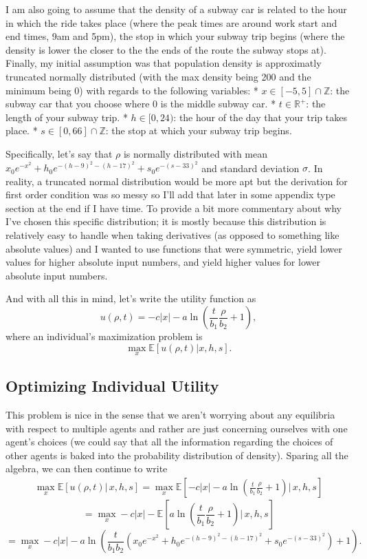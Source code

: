 \documentclass[11pt]{article}
\begin{document}
I am also going to assume that the density of a subway car is related to
the hour in which the ride takes place (where the peak times are around
work start and end times, 9am and 5pm), the stop in which your subway
trip begins (where the density is lower the closer to the the ends of
the route the subway stops at). Finally, my initial assumption was that
population density is approximatly truncated normally distributed (with
the max density being 200 and the minimum being 0) with regards to the
following variables: * \(x \in [-5,5]\cap \mathbb{Z}\): the subway car
that you choose where 0 is the middle subway car. *
\(t \in \mathbb{R}^+\): the length of your subway trip. *
\(h \in [0,24)\): the hour of the day that your trip takes place. *
\(s \in [0,66]\cap \mathbb{Z}\): the stop at which your subway trip
begins.

Specifically, let's say that \(\rho\) is normally distributed with mean
\(x_0e^{-x^2} + h_0e^{-(h-9)^2 - (h-17)^2} + s_0e^{-(s-33)^2}\) and
standard deviation \(\sigma\). In reality, a truncated normal
distribution would be more apt but the derivation for first order
condition was so messy so I'll add that later in some appendix type
section at the end if I have time. To provide a bit more commentary
about why I've chosen this specific distribution; it is mostly because
this distribution is relatively easy to handle when taking derivatives
(as opposed to something like absolute values) and I wanted to use
functions that were symmetric, yield lower values for higher absolute
input numbers, and yield higher values for lower absolute input numbers.

And with all this in mind, let's write the utility function as
\[u(\rho, t) = -c|x| - a\ln\left(\frac{t}{b_1}\frac{\rho}{b_2} + 1\right),\]
where an individual's maximization problem is
\[\max_{x}\mathbb{E}\left[u(\rho, t)|x,h,s\right].\]

    \hypertarget{optimizing-individual-utility}{%
\subsection{Optimizing Individual
Utility}\label{optimizing-individual-utility}}

    This problem is nice in the sense that we aren't worrying about any
equilibria with respect to multiple agents and rather are just
concerning ourselves with one agent's choices (we could say that all the
information regarding the choices of other agents is baked into the
probability distribution of density). Sparing all the algebra, we can
then continue to write
\[\begin{align}\max_{x}\mathbb{E}\left[u(\rho, t)|\,x,h,s\right] = \max_{x}\mathbb{E}\left[-c|x| - a\ln\left(\frac{t}{b_1}\frac{\rho}{b_2} + 1\right)\big| \,x,h,s\right] \end{align}\]
\[= \max_{x}-c|x| - \mathbb{E}\left[a\ln\left(\frac{t}{b_1}\frac{\rho}{b_2} + 1\right)\big| \,x,h,s\right]\]
\[ = \max_{x}-c|x| - a\ln\left(\frac{t}{b_1b_2}\left(x_0e^{-x^2} + h_0e^{-(h-9)^2 - (h-17)^2} + s_0e^{-(s-33)^2}\right)+ 1\right).\]
\end{document}
